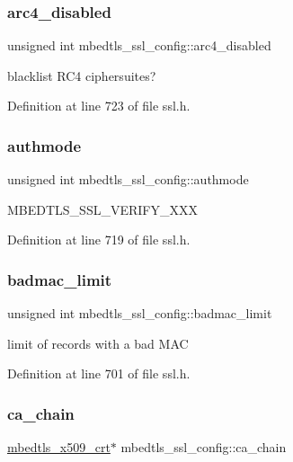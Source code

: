 \subsubsection{\texorpdfstring{arc4\+\_\+disabled}{arc4\_disabled}}
{\footnotesize\ttfamily unsigned int mbedtls\+\_\+ssl\+\_\+config\+::arc4\+\_\+disabled}

blacklist R\+C4 ciphersuites? 

Definition at line 723 of file ssl.\+h.

\mbox{\label{structmbedtls__ssl__config_a0d3c2ea8eaf59a5acfcdb6b123148c1f}} 
\subsubsection{\texorpdfstring{authmode}{authmode}}
{\footnotesize\ttfamily unsigned int mbedtls\+\_\+ssl\+\_\+config\+::authmode}

M\+B\+E\+D\+T\+L\+S\+\_\+\+S\+S\+L\+\_\+\+V\+E\+R\+I\+F\+Y\+\_\+\+X\+XX 

Definition at line 719 of file ssl.\+h.

\mbox{\label{structmbedtls__ssl__config_ab61653cfcc80cc9d0d902705212c6e4e}} 
\subsubsection{\texorpdfstring{badmac\+\_\+limit}{badmac\_limit}}
{\footnotesize\ttfamily unsigned int mbedtls\+\_\+ssl\+\_\+config\+::badmac\+\_\+limit}

limit of records with a bad M\+AC 

Definition at line 701 of file ssl.\+h.

\mbox{\label{structmbedtls__ssl__config_a4087cd54ed61e8a5792725e0fcdf1321}} 
\subsubsection{\texorpdfstring{ca\+\_\+chain}{ca\_chain}}
{\footnotesize\ttfamily \mbox{\hyperlink{structmbedtls__x509__crt}{mbedtls\+\_\+x509\+\_\+crt}}$\ast$ mbedtls\+\_\+ssl\+\_\+config\+::ca\+\_\+chain}


